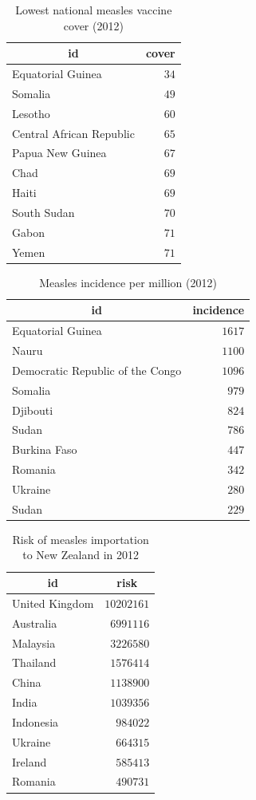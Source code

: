 \documentclass{article}
\begin{document}
\begin{table}
\caption{Lowest national measles vaccine cover (2012)}
\begin{center}
\begin{tabular}{lr}
\hline\hline
\multicolumn{1}{c}{id}&\multicolumn{1}{c}{cover}\tabularnewline
\hline
Equatorial Guinea&$34$\tabularnewline
Somalia&$49$\tabularnewline
Lesotho&$60$\tabularnewline
Central African Republic&$65$\tabularnewline
Papua New Guinea&$67$\tabularnewline
Chad&$69$\tabularnewline
Haiti&$69$\tabularnewline
South Sudan&$70$\tabularnewline
Gabon&$71$\tabularnewline
Yemen&$71$\tabularnewline
\hline
\end{tabular}\end{center}\label{table:cover12}
\end{table}

\begin{table}
\caption{Measles incidence per million (2012)}
\begin{center}
\begin{tabular}{lr}
\hline\hline
\multicolumn{1}{c}{id}&\multicolumn{1}{c}{incidence}\tabularnewline
\hline
Equatorial Guinea&$1617$\tabularnewline
Nauru&$1100$\tabularnewline
Democratic Republic of the Congo&$1096$\tabularnewline
Somalia&$ 979$\tabularnewline
Djibouti&$ 824$\tabularnewline
Sudan&$ 786$\tabularnewline
Burkina Faso&$ 447$\tabularnewline
Romania&$ 342$\tabularnewline
Ukraine&$ 280$\tabularnewline
Sudan&$ 229$\tabularnewline
\hline
\end{tabular}\end{center}\label{table:incidence12}
\end{table}

\begin{table}
\caption{Risk of measles importation to New Zealand in 2012}
\begin{center}
\begin{tabular}{lr}
\hline\hline
\multicolumn{1}{c}{id}&\multicolumn{1}{c}{risk}\tabularnewline
\hline
United Kingdom&$10202161$\tabularnewline
Australia&$ 6991116$\tabularnewline
Malaysia&$ 3226580$\tabularnewline
Thailand&$ 1576414$\tabularnewline
China&$ 1138900$\tabularnewline
India&$ 1039356$\tabularnewline
Indonesia&$  984022$\tabularnewline
Ukraine&$  664315$\tabularnewline
Ireland&$  585413$\tabularnewline
Romania&$  490731$\tabularnewline
\hline
\end{tabular}\end{center}\label{table:risk12}
\end{table}
\end{document}
